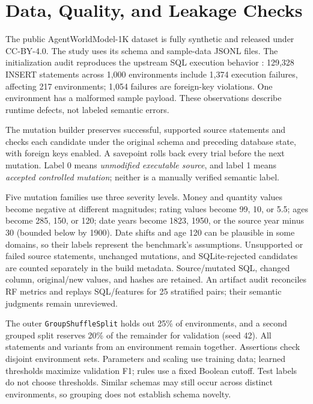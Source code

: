 \documentclass[conference]{IEEEtran}
\begin{document}
\section{Data, Quality, and Leakage Checks}
The public AgentWorldModel-1K dataset \cite{snowflake2026awm} is fully synthetic and released under CC-BY-4.0. The study uses its schema and sample-data JSONL files. The initialization audit reproduces the upstream SQL execution behavior \cite{snowflakecode}: 129,328 INSERT statements across 1,000 environments include 1,374 execution failures, affecting 217 environments; 1,054 failures are foreign-key violations. One environment has a malformed sample payload. These observations describe runtime defects, not labeled semantic errors.

\RawQualitySummary

The mutation builder preserves successful, supported source statements and checks each candidate under the original schema and preceding database state, with foreign keys enabled. A savepoint rolls back every trial before the next mutation. Label 0 means \emph{unmodified executable source}, and label 1 means \emph{accepted controlled mutation}; neither is a manually verified semantic label. \DatasetSummary

Five mutation families use three severity levels. Money and quantity values become negative at different magnitudes; rating values become 99, 10, or 5.5; ages become 285, 150, or 120; date years become 1823, 1950, or the source year minus 30 (bounded below by 1900). Date shifts and age 120 can be plausible in some domains, so their labels represent the benchmark's assumptions. Unsupported or failed source statements, unchanged mutations, and SQLite-rejected candidates are counted separately in the build metadata. Source/mutated SQL, changed column, original/new values, and hashes are retained. An artifact audit reconciles RF metrics and replays SQL/features for 25 stratified pairs; their semantic judgments remain unreviewed.

The outer \texttt{GroupShuffleSplit} holds out 25\% of environments, and a second grouped split reserves 20\% of the remainder for validation (seed 42). \SplitSummary{} All statements and variants from an environment remain together. Assertions check disjoint environment sets. Parameters and scaling use training data; learned thresholds maximize validation F1; rules use a fixed Boolean cutoff. Test labels do not choose thresholds. Similar schemas may still occur across distinct environments, so grouping does not establish schema novelty.
\end{document}
